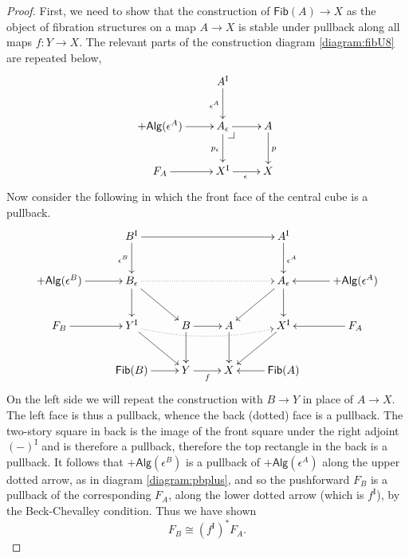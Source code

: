 \documentclass[11pt]{article}
\makeatletter
\newcommand{\pbcorner}[1][dr]{\save*!/#1-1.2pc/#1:(-1,1)@^{|-}\restore}
\newcommand{\ra}{\ensuremath{\rightarrow}}
\newcommand{\I}{\ensuremath{\mathrm{I}}}
\newcommand{\Fib}{\ensuremath{\mathsf{Fib}}}
\theoremstyle{remark}
\theoremstyle{definition}
\makeatother
\begin{document}
\begin{proof}
First, we need to show that the construction of $\Fib(A)\ra X$ as the object of fibration structures on a map $A\ra X$ is stable under pullback along all maps $f : Y\ra X$.
The relevant parts of the construction diagram \eqref{diagram:fibU8} are repeated below,
\begin{equation}\label{diagram:fibU8}
\xymatrix{
&A^\I \ar[d]_{\epsilon^A} & \\
+\mathsf{Alg}(\epsilon^A) \ar[r] & A_\epsilon\ar[d]_{p_\epsilon} \ar[r] \pbcorner & A \ar[d]^{p} \\
F_A \ar[r] & X^\I \ar[r]_{\epsilon} &  X 
}
\end{equation}
Now consider the following in which the front face of the central cube is a pullback.
\begin{equation}\label{diagram:fibU9}
\xymatrix{
 & B^\I \ar[rrr] \ar[d]_{\epsilon^B} &&& A^\I \ar[d]^{\epsilon^A} &\\
 +\mathsf{Alg}(\epsilon^B) \ar[r] & B_\epsilon \ar[d] \ar[rd] \ar@{.>}[rrr] &&& A_\epsilon \ar[d] \ar[ld] &  +\mathsf{Alg}(\epsilon^A) \ar[l] \\
 F_B  \ar[r] & Y^\I \ar[rd] \ar@{.>}@/_.75pc/[rrr] & B \ar[r] \ar[d] & A \ar[d] &  X^\I \ar[ld]  & \ar[l] F_A \\
 &\Fib(B) \ar[r] & Y \ar[r]_f & X &\Fib(A) \ar[l] &
 }
\end{equation}
On the left side we will repeat the construction with $B \ra Y$ in place of $A\ra X$.  
The left face is thus a pullback, whence the back (dotted) face is a pullback.  The two-story square in back is the image of the front square under the right adjoint $(-)^\I$ and is therefore a  pullback, therefore the top rectangle in the back is a pullback. 
It follows that $+\mathsf{Alg}(\epsilon^B)$ is a pullback of $+\mathsf{Alg}(\epsilon^A)$ along the upper dotted arrow, as in diagram \eqref{diagram:pbplus}, and so the pushforward $F_B$ is a pullback of the corresponding $F_A$, along the lower dotted arrow (which is $f^\I$), by the Beck-Chevalley condition.  Thus we have shown
\begin{equation}\label{eq:pbFB}
F_B \cong (f^\I)^*F_A.
\end{equation}


\end{proof}
\end{document}
